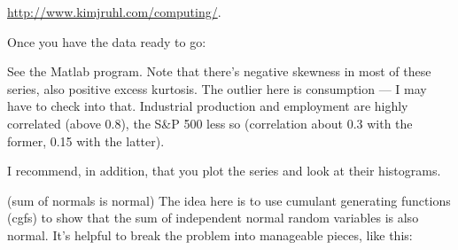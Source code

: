 \documentclass[11pt]{exam}
\begin{document}
\begin{questions}
\begin{itemize}
\medskip
\centerline{\url{http://www.kimjruhl.com/computing/}.}
\end{itemize}
%
Once you have the data ready to go:
%

\begin{solution}
See the Matlab program.
Note that there's negative skewness in most of these series,
also positive excess kurtosis.
The outlier here is consumption --- I may have to check into that.
Industrial production and employment are highly correlated
(above 0.8), the S\&P 500 less so (correlation about 0.3 with
the former, 0.15 with the latter).

I recommend, in addition, that you plot the series and look at their
histograms.
\end{solution}

 (sum of normals is normal)
The idea here is to use cumulant generating functions (cgfs)
to show that the sum of independent normal random variables is also normal.
It's helpful to break the problem into manageable pieces, like this:
\end{questions}
\end{document}
